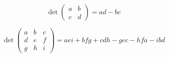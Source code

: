 \begin{figure}[H]
    \begin{equation*}
        \det\begin{pmatrix}
        a & b \\
        c & d
        \end{pmatrix}
        = ad - bc
    \end{equation*}
\end{figure}

\begin{figure}[H]
    \begin{equation*}
        \det\begin{pmatrix}
        a & b & c \\
        d & e & f \\
        g & h & i
        \end{pmatrix}
        = aei + bfg + cdh - gec - hfa - ibd
    \end{equation*}
\end{figure}
